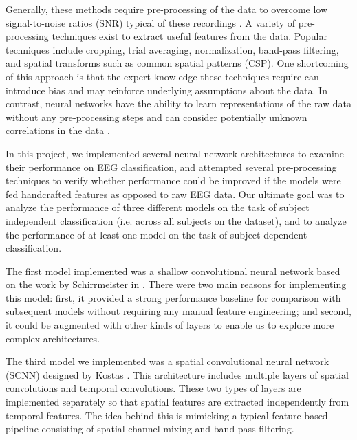 \documentclass[10pt,twocolumn,letterpaper]{article}
\begin{document}
Generally, these methods require pre-processing of the data to overcome low
signal-to-noise ratios (SNR) typical of these recordings
\cite{kostas2019machine}.
A variety of pre-processing techniques exist to extract useful features from the
data. Popular techniques include cropping, trial averaging, normalization,
band-pass filtering, and spatial transforms such as common spatial patterns
(CSP). One shortcoming of this approach is that the expert knowledge these
techniques require can introduce bias and may reinforce underlying assumptions
about the data.
In contrast, neural networks have the ability to learn representations of the
raw data without any pre-processing steps and can consider potentially unknown
correlations in the data \cite{kostas2019machine}.

In this project, we implemented several neural network architectures to examine
their performance on EEG classification, and attempted several pre-processing
techniques to verify whether performance could be improved if the models were
fed handcrafted features as opposed to raw EEG data.
Our ultimate goal was to analyze the performance of three different models on
the task of subject independent classification (i.e. across all subjects on the
dataset), and to analyze the performance of at least one model on the task of
subject-dependent classification. 

The first model implemented was a shallow convolutional neural network
based on the work by Schirrmeister \etal in \cite{DBLP}. There were two main
reasons for implementing this model: first, it provided a strong performance
baseline for comparison with subsequent models without requiring any manual
feature engineering; and second, it could be augmented with other kinds of
layers to enable us to explore more complex architectures.


The third model we implemented was a spatial convolutional neural network
(SCNN) designed by Kostas \etal \cite{kostas2019machine}. This architecture
includes multiple layers of spatial convolutions and temporal convolutions.
These two types of layers are implemented separately so that spatial features
are extracted independently from temporal features. The idea behind this is
mimicking a typical feature-based pipeline consisting of spatial channel mixing
and band-pass filtering.
\end{document}
